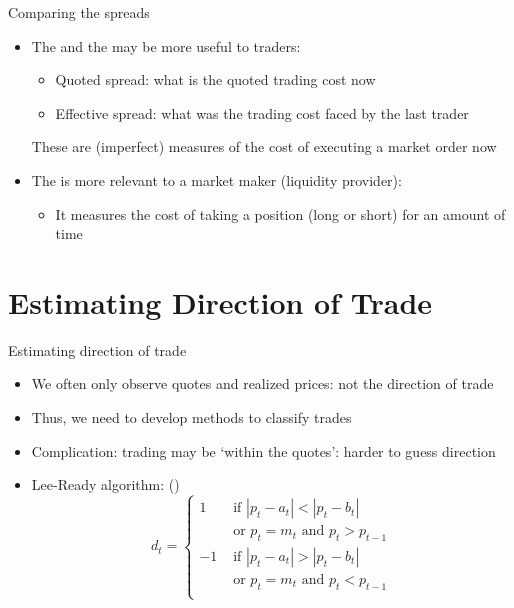 \documentclass[english,10pt
,aspectratio=169
]{beamer}
\begin{document}
\begin{frame}{Comparing the spreads}
	\begin{itemize}
		\item The  and the  may be more useful to traders:
		\begin{itemize}
			\item Quoted spread: what is the quoted trading cost now 
			\item Effective spread: what was the trading cost faced by the last trader
		\end{itemize}
		These are (imperfect) measures of the cost of executing a market order now
		\item The  is more relevant to a market maker (liquidity provider):
		\begin{itemize}
			\item It measures the cost of taking a position (long or short) for an amount of time
		\end{itemize}
	\end{itemize}
\end{frame}



\section{Estimating Direction of Trade}


\begin{frame}{Estimating direction of trade}
	\begin{itemize}
		\item We often only observe quotes and realized prices: not the direction of trade
		\item Thus, we need to develop methods to classify trades
		\item Complication: trading may be `within the quotes': harder to guess direction
		\item \alert{Lee-Ready algorithm}: (\citet{lee_inferring_1991})
		\[
		d_t = \left\{
		\begin{aligned}
		1 & \text{ if } |p_t-a_t| < |p_t-b_t| \\
		&\text{ or } p_t=m_t \text{ and } p_t>p_{t-1}\\
		-1 & \text{ if } |p_t-a_t| > |p_t-b_t| \\
		& \text{ or } p_t=m_t \text{ and } p_t<p_{t-1} \\
		\end{aligned}
		\right.
		\]
	\end{itemize}
\end{frame}
\end{document}
